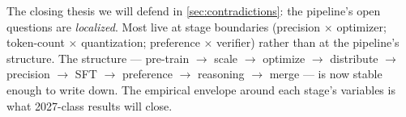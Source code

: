 The closing thesis we will defend in \cref{sec:contradictions}: the
pipeline's open questions are \emph{localized}. Most live at stage
boundaries (precision $\times$ optimizer; token-count $\times$
quantization; preference $\times$ verifier) rather than at the
pipeline's structure. The structure --- pre-train $\to$ scale $\to$
optimize $\to$ distribute $\to$ precision $\to$ SFT $\to$ preference
$\to$ reasoning $\to$ merge --- is now stable enough to write down.
The empirical envelope around each stage's variables is what
2027-class results will close.
